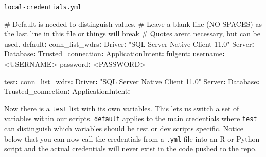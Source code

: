 \documentclass[
  letterpaper,
  DIV=11,
  numbers=noendperiod,
  oneside]{scrartcl}
\newenvironment{Shaded}{\begin{snugshade}}{\end{snugshade}}
\newcommand{\AttributeTok}[1]{\textcolor[rgb]{0.40,0.45,0.13}{#1}}
\newcommand{\CommentTok}[1]{\textcolor[rgb]{0.37,0.37,0.37}{#1}}
\newcommand{\FunctionTok}[1]{\textcolor[rgb]{0.28,0.35,0.67}{#1}}
\newcommand{\KeywordTok}[1]{\textcolor[rgb]{0.00,0.23,0.31}{\textbf{#1}}}
\newcommand{\StringTok}[1]{\textcolor[rgb]{0.13,0.47,0.30}{#1}}
\begin{document}
\begin{codelisting}

\caption{\texttt{local-credentials.yml}}

\begin{Shaded}
\begin{Highlighting}[]
\CommentTok{\# Default is needed to distinguish values.}
\CommentTok{\# Leave a blank line (NO SPACES) as the last line in this file or things will break}
\CommentTok{\# Quotes aren\textquotesingle{}t necessary, but can be used.}
\FunctionTok{default}\KeywordTok{:}\AttributeTok{ }
\AttributeTok{  }\FunctionTok{conn\_list\_wdrs}\KeywordTok{:}
\AttributeTok{    }\FunctionTok{Driver}\KeywordTok{:}\AttributeTok{ }\StringTok{"SQL Server Native Client 11.0"}
\AttributeTok{    }\FunctionTok{Server}\KeywordTok{:}\AttributeTok{ }
\AttributeTok{    }\FunctionTok{Database}\KeywordTok{:}\AttributeTok{ }
\AttributeTok{    }\FunctionTok{Trusted\_connection}\KeywordTok{:}\AttributeTok{ }
\AttributeTok{    }\FunctionTok{ApplicationIntent}\KeywordTok{:}\AttributeTok{ }
\AttributeTok{    }
\AttributeTok{  }\FunctionTok{fulgent}\KeywordTok{:}
\AttributeTok{    }\FunctionTok{username}\KeywordTok{:}\AttributeTok{ \textless{}USERNAME\textgreater{}}
\AttributeTok{    }\FunctionTok{password}\KeywordTok{:}\AttributeTok{ \textless{}PASSWORD\textgreater{}}

\FunctionTok{test}\KeywordTok{:}
\AttributeTok{  }\FunctionTok{conn\_list\_wdrs}\KeywordTok{:}
\AttributeTok{    }\FunctionTok{Driver}\KeywordTok{:}\AttributeTok{ }\StringTok{"SQL Server Native Client 11.0"}
\AttributeTok{    }\FunctionTok{Server}\KeywordTok{:}\AttributeTok{ }
\AttributeTok{    }\FunctionTok{Database}\KeywordTok{:}\AttributeTok{ }
\AttributeTok{    }\FunctionTok{Trusted\_connection}\KeywordTok{:}\AttributeTok{ }
\AttributeTok{    }\FunctionTok{ApplicationIntent}\KeywordTok{:}\AttributeTok{ }
\end{Highlighting}
\end{Shaded}

\end{codelisting}

Now there is a \texttt{test} list with its own variables. This lets us
switch a set of variables within our scripts. \texttt{default} applies
to the main credentials where \texttt{test} can distinguish which
variables should be test or dev scripts specific. Notice below that you
can now call the credentials from a \texttt{.yml} file into an R or
Python script and the actual credentials will never exist in the code
pushed to the repo.
\end{document}
